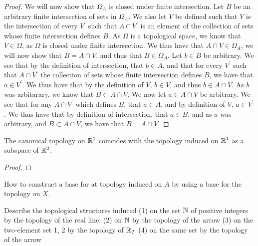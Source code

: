 \begin{proof}
  We will now show that $\Omega_A$ is closed under finite
  intersection. Let $B$ be an arbitrary finite intersection of sets in
  $\Omega_A$. We also let $V$ be defined such that $V$ is the
  intersection of every $V^\prime$ such that $A\cap V^\prime$ is an
  element of the collection of sets whose finite intersection defines
  $B$. As $\Omega$ is a topological space, we know that $V\in \Omega$,
  as $\Omega$ is closed under finite intersection. We thus have that
  $A\cap V \in \Omega_A$, we will now show that $B =A\cap V$, and thus
  that $B\in \Omega_A$. Let $b \in B$ be arbitrary. We see that by the
  definition of intersection, that $b \in A$, and that for every
  $V^\prime$ such that $A\cap V^\prime$ the collection of sets whose
  finite intersection defines $B$, we have that $a \in V^\prime$. We
  thus have that by the definition of $V$, $b\in V$, and thus $b \in A
  \cap V$. As $b$ was arbitarary, we know that $B \subset A \cap
  V$. We now let $a \in A \cap V$ be arbitrary. We see that for any $A
  \cap V^\prime$ which defines $B$, that $a \in A$, and by definition
  of $V$, $a \in V^\prime$. We thus have that by definition of
  intersection, that $a \in B$, and as $a$ was arbitrary, and 
  $B \subset A \cap V$, we have that $B = A \cap V$.
  
  
\end{proof}

\begin{majorEx}%
The canonical topology on $\mathbb{R}^1$ coincides with the topology induced on $\mathbb{R}^1$ as a subspace of $\mathbb{R}^2$.
\end{majorEx}
\begin{proof}
\end{proof}

\begin{minorEx}[Riddle]%
How to construct a base for at topology induced on $A$ by using a base for the topology on $X$.
\end{minorEx}

\begin{minorEx}%
Describe the topological structures induced
(1) on the set $\mathbb{N}$ of positive integers by the topology of the real line:
(2) on $\mathbb{N}$ by the topology of the arrow
(3) on the two-element set {1, 2} by the topology of $\mathbb{R}_T$
(4) on the same set by the topology of the arrow
\end{minorEx}

